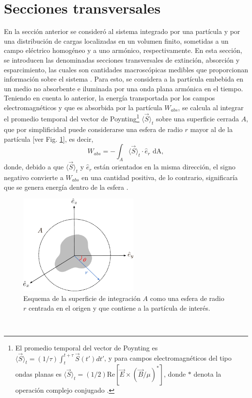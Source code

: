 

\section{Secciones transversales}
\label{section:yth}

En la sección anterior se consideró al sistema integrado por una partícula y por una distribución de cargas localizadas en un volumen finito, sometidas a un campo eléctrico homogéneo y a uno armónico, respectivamente. En esta sección, se introducen las denominadas secciones transversales de extinción, absorción y esparcimiento, las cuales son cantidades macroscópicas medibles que proporcionan información sobre el sistema \cite{Bohren}. Para esto, se considera a la partícula embebida en un medio no absorbente e iluminada por una onda plana armónica en el tiempo. Teniendo en cuenta lo anterior, la energía transportada por los campos electromagnéticos y que es absorbida por la partícula $W_{abs}$, se calcula al integrar el promedio temporal del vector de Poynting\footnote{El promedio temporal del vector de Poynting es $\langle\Vec{S}\rangle_t = (1/\tau)\int_t^{t+\tau}\Vec{S}(t')dt'$, y para campos electromagnéticos del tipo ondas planas es $\langle\Vec{S}\rangle_t = (1/2) \text{Re}[\Vec{E} \times (\Vec{B}/\mu)^{*}]$, donde $*$ denota la operación complejo conjugado \cite{Bohren}. } $\langle\Vec{S}\rangle_t$  sobre una superficie cerrada $A$, que por simplificidad puede considerarse una esfera de radio $r$ mayor al de la partícula [ver Fig. \ref{WA}], es decir, 
\begin{equation*}
	W_{abs}=-\int_A \langle\Vec{S}\rangle_t\cdot\hat{e}_r \text{ dA},
	\label{flujopoynting}
\end{equation*}
donde, debido a que $\langle\Vec{S}\rangle_t$ y $\hat{e}_r$ están orientados en la misma dirección, el signo negativo convierte a $W_{abs}$ en una cantidad positiva, de lo contrario, significaría que se genera energía dentro de la esfera \cite{Bohren}.
\begin{figure}[h]
	\centering
	\includegraphics[width=6cm]{../../Figuras/WA.pdf}
	\caption{Esquema de la superficie de integración $A$ como una esfera de radio $r$ centrada en el origen y que contiene a la partícula de interés.}
	\label{WA}
\end{figure}
\\

